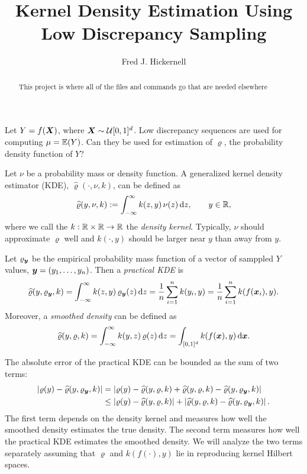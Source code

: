\documentclass{amsart}
\newcommand{\hvarrho}{\widehat{\varrho}}
\begin{document}
\title{Kernel Density Estimation Using Low Discrepancy Sampling}
\author{Fred J. Hickernell}
\begin{abstract}This project is where all of the files and commands go that are needed elsewhere
\end{abstract}

\maketitle

Let $Y = f(\boldsymbol{X})$, where $\boldsymbol{X} \sim \mathcal{U}[0,1]^d$.  Low discrepancy sequences are used for computing  $\mu = \operatorname{\mathbb{E}}(Y)$.  Can they be used for estimation of $\varrho$, the probability density function of $Y$?

Let $\nu$ be a probability mass or density function.  A generalized kernel density estimator (KDE), $\hvarrho(\cdot,\nu,k)$, can be defined as
\[
\hvarrho(y,\nu,k) := \int_{-\infty}^{\infty} k(z,y) \, \nu(z) \, \dif z, \qquad y \in \reals,
\]
where we call the $k:\mathbb{R} \times \mathbb{R} \to \mathbb{R}$ the \emph{density kernel}.  Typically, $\nu$ should approximate $\varrho$ well and $k(\cdot,y)$ should be larger near $y$ than away from $y$.

Let $\varrho_{\boldsymbol{y}}$ be the empirical probability mass function of a vector of samppled $Y$ values, $\boldsymbol{y} = (y_1, \ldots, y_n)$.  Then a \emph{practical KDE} is
\begin{equation*}
\hvarrho(y,\varrho_{\vy},k) = \int_{-\infty}^{\infty} k(z,y) \, \varrho_{\vy}(z) \, \dif z = \frac 1n \sum_{i=1}^n k(y_i,y) \\
 = \frac 1n \sum_{i=1}^n k(f(\vx_i),y) .
\end{equation*}
Moreover, a \emph{smoothed density} can be defined as
\[
\hvarrho(y,\varrho,k) = \int_{-\infty}^{\infty} k(y,z) \, \varrho(z) \, \dif z = \int_{[0,1]^d} k(f(\vx),y) \,  \dif \vx.
\]

The absolute error of the practical KDE  can be bounded as the sum of two terms:
\begin{align*}
    \abs{\varrho(y) - \hvarrho(y,\varrho_{\vy},k)} & =
     \abs{\varrho(y) - \hvarrho(y,\varrho,k) + \hvarrho(y,\varrho,k) - \hvarrho(y,\varrho_{\vy},k)} \\
     & \le  \abs{\varrho(y) - \hvarrho(y,\varrho,k)} + \abs{\hvarrho(y,\varrho,k) - \hvarrho(y,\varrho_{\vy},k)}.
\end{align*}
The first term depends on the density kernel and measures how well the smoothed density estimates the true density.  The second term measures how well the practical KDE estimates the smoothed density.
We will analyze the two terms separately assuming that $\varrho$ and $k(f(\cdot),y)$ lie in reproducing kernel Hilbert spaces.
\end{document}

